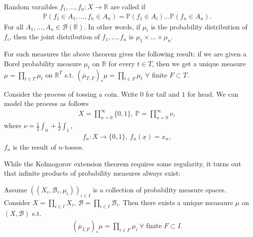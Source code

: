 Random varaibles \(f_1,...,f_n:X\rightarrow\mathbb{R}\) are called  if 
\begin{align*}
    \mathbb{P}(f_1\in A_1, ..., f_n\in A_n) = \mathbb{P}(f_1\in A_i) ... \mathbb{P}(f_n\in A_n).
\end{align*}
For all \(A_1,...,A_n\in\mathscr{B}(\mathbb{R})\). In other words, if \(\mu_i\) is the probability distribution of \(f_i\), then the joint distribution of \(f_1,...,f_n\) is \(\mu_1\times ...\times\mu_n\).

For such measures the above theorem gives the following result: if we are given a Borel probability measure \(\mu_t\) on \(\mathbb{R}\) for every \(t\in T\), then we get a unique measure \(\mu=\prod_{t\in T}\mu_t\) on \(\mathbb{R}^T\) s.t. \((\overline{\mu}_{T,F})_{*}\mu=\prod_{t\in F}\mu_t\) \(\forall\) finite \(F\subset T\).
\begin{example}
    Consider the process of tossing a coin. Write \(0\) for tail and \(1\) for head. We can model the process as follows
    \begin{align*}
        X=\prod\limits_{n=0}^{\infty}\{0,1\}, \ \mathbb{P}=\prod\limits_{n=0}^{\infty}\nu, 
    \end{align*}
    where \(\nu=\frac{1}{2}\int_0+\frac{1}{2}\int_1\),
    \begin{align*}
        f_n :X\rightarrow \{ 0,1 \}, \ f_n(\underline{x}) = x_n,
    \end{align*}
    \(f_n\) is the result of \(n\)-tosses.
\end{example}
While the Kolmogorov extension theorem requires some regularity, it turns out that infinite products of probability measures always exist:
\begin{theorem}
    Assume \(((X_i,\mathscr{B}_i,\mu_i))_{i\in I}\) is a collection of probability measure spaces. Consider \(X=\prod_{i\in I}X_i\), \(\mathscr{B}=\prod_{i\in I}\mathscr{B}_i\). Then there exists a unique measaure \(\mu\) on \((X,\mathscr{B})\) s.t. 
    \begin{align*}
        (\overline{\mu}_{I,F})_{*}\mu = \prod\limits_{i\in F}\mu_i \ \forall \text{ finite } F\subset I.
    \end{align*}
\end{theorem}